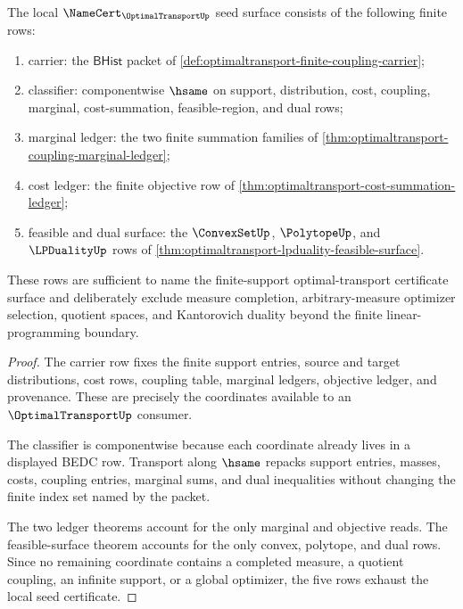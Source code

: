 \begin{theorem}
\label{thm:optimaltransport-namecert-obligation-surface}
The local $\NameCert_{\OptimalTransportUp}$ seed surface consists of the following finite rows:
\begin{enumerate}
\item carrier: the $\mathsf{BHist}$ packet of \autoref{def:optimaltransport-finite-coupling-carrier};
\item classifier: componentwise $\hsame$ on support, distribution, cost, coupling, marginal, cost-summation, feasible-region, and dual rows;
\item marginal ledger: the two finite summation families of \autoref{thm:optimaltransport-coupling-marginal-ledger};
\item cost ledger: the finite objective row of \autoref{thm:optimaltransport-cost-summation-ledger};
\item feasible and dual surface: the $\ConvexSetUp$, $\PolytopeUp$, and $\LPDualityUp$ rows of \autoref{thm:optimaltransport-lpduality-feasible-surface}.
\end{enumerate}
These rows are sufficient to name the finite-support optimal-transport certificate surface and deliberately exclude measure completion, arbitrary-measure optimizer selection, quotient spaces, and Kantorovich duality beyond the finite linear-programming boundary.
\end{theorem}
\begin{proof}
The carrier row fixes the finite support entries, source and target distributions, cost rows, coupling table, marginal ledgers, objective ledger, and provenance. These are precisely the coordinates available to an $\OptimalTransportUp$ consumer.

The classifier is componentwise because each coordinate already lives in a displayed BEDC row. Transport along $\hsame$ repacks support entries, masses, costs, coupling entries, marginal sums, and dual inequalities without changing the finite index set named by the packet.

The two ledger theorems account for the only marginal and objective reads. The feasible-surface theorem accounts for the only convex, polytope, and dual rows. Since no remaining coordinate contains a completed measure, a quotient coupling, an infinite support, or a global optimizer, the five rows exhaust the local seed certificate.
\end{proof}

